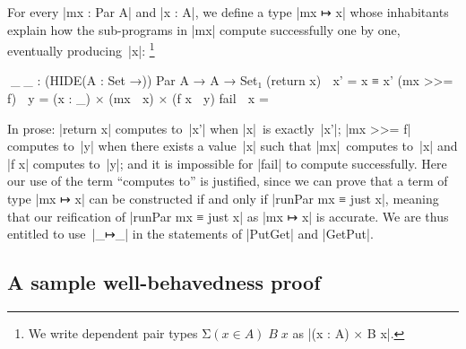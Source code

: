 \documentclass[fleqn]{llncs}
\begin{document}
For every |mx : Par A| and |x : A|, we define a type |mx ↦ x| whose inhabitants explain how the sub-programs in |mx| compute successfully one by one, eventually producing~|x|:%
\footnote{We write dependent pair types $\mathrm{\Sigma}(x \in A)\;B\;x$ as |(x : A) × B x|.}
\begin{code}
^^^_↦_ : (HIDE({A : Set} →)) Par A → A → Set₁
(return x)  ↦ x'  =  x ≡ x'
(mx >>= f)  ↦ y   =  (x : _) × (mx ↦ x) × (f x ↦ y)
fail        ↦ x   =  ⊥
\end{code}
In prose: |return x| computes to~|x'| when |x|~is exactly~|x'|; |mx >>= f| computes to~|y| when there exists a value~|x| such that |mx|~computes to~|x| and |f x| computes to~|y|; and it is impossible for |fail| to compute successfully.
Here our use of the term ``computes to'' is justified, since we can prove that a term of type |mx ↦ x| can be constructed if and only if |runPar mx ≡ just x|, meaning that our reification of |runPar mx ≡ just x| as |mx ↦ x| is accurate.
We are thus entitled to use~|_↦_| in the statements of |PutGet| and |GetPut|.

\subsection{A sample well-behavedness proof}
\label{sec:sample-well-behavedness-proof}
\end{document}
